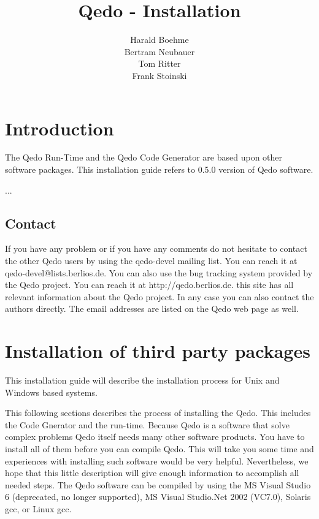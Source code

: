 \documentclass[12pt,a4paper]{report}
\begin{document}
\title{Qedo - Installation}
\author{Harald Boehme \\ Bertram Neubauer \\ Tom Ritter \\ Frank Stoinski}

\maketitle

\setcounter{page}{1}

\tableofcontents


\chapter{Introduction}
\label{sec:Introduction}

The Qedo Run-Time and the Qedo Code Generator are based upon other software packages.
This installation guide refers to {0.5.0} version of Qedo software.

...

\section{Contact}
\label{sec:Contact}

If you have any problem or if you have any comments do not hesitate to contact the other Qedo users by using the qedo-devel mailing list. You can reach it at qedo-devel@lists.berlios.de. You can also use the bug tracking system provided by the Qedo project. You can reach it at http://qedo.berlios.de. this site has all relevant information about the Qedo project. In any case you can also contact the authors directly. The email addresses are listed on the Qedo web page as well.


\chapter{Installation of third party packages}
\label{sec:Installation}

This installation guide will describe the installation process for Unix and Windows based systems.

This following sections describes the process of installing the Qedo. This includes the Code Gnerator and the run-time. Because Qedo is a software that solve complex problems Qedo itself needs many other software products. You have to install all of them before you can compile Qedo. This will take you some time and experiences with installing such software would be very helpful. Nevertheless, we hope that this little description will give enough information to accomplish all needed steps.
The Qedo software can be compiled by using the MS Visual Studio 6 (deprecated, no longer supported), MS Visual Studio.Net 2002 (VC7.0), Solaris gcc, or Linux gcc.
\end{document}
